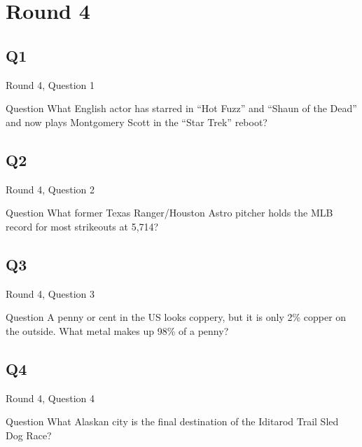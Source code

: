 \documentclass[11pt]{beamer}
\begin{document}
\section{Round 4}
    

\subsection*{Q1}
\begin{frame}[t]{Round 4, Question 1}
\vspace{2em}
\begin{block}{Question}
What English actor has starred in ``Hot Fuzz'' and ``Shaun of the Dead'' and now plays Montgomery Scott in the ``Star Trek'' reboot\@?
\end{block}
\end{frame}
    

\subsection*{Q2}
\begin{frame}[t]{Round 4, Question 2}
\vspace{2em}
\begin{block}{Question}
What former Texas Ranger/Houston Astro pitcher holds the MLB record for most strikeouts at 5,714\@?
\end{block}
\end{frame}
    

\subsection*{Q3}
\begin{frame}[t]{Round 4, Question 3}
\vspace{2em}
\begin{block}{Question}
A penny or cent in the US looks coppery, but it is only 2\% copper on the outside. What metal makes up 98\% of a penny\@?
\end{block}
\end{frame}
    

\subsection*{Q4}
\begin{frame}[t]{Round 4, Question 4}
\vspace{2em}
\begin{block}{Question}
What Alaskan city is the final destination of the Iditarod Trail Sled Dog Race\@?
\end{block}
\end{frame}
    
\end{document}
